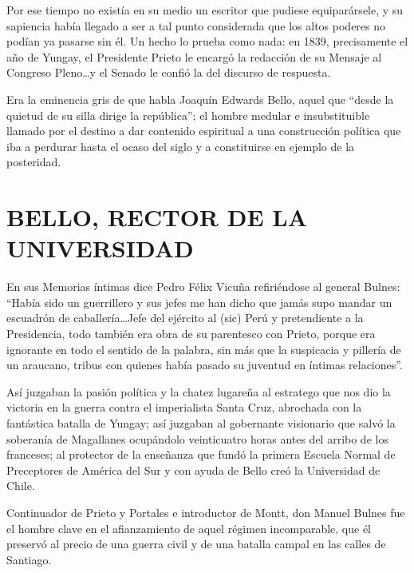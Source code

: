 \documentclass[10pt,twoside,openright]{memoir}
\begin{document}
Por ese tiempo no existía en su medio un escritor que pudiese
equiparársele, y su sapiencia había llegado a ser a tal punto
considerada que los altos poderes no podían ya pasarse sin él. Un hecho
lo prueba como nada: en 1839, precisamente el año de Yungay, el
Presidente Prieto le encargó la redacción de su Mensaje al Congreso
Pleno\ldots y el Senado le confió la del discurso de respuesta.

Era la eminencia gris de que habla Joaquín Edwards Bello, aquel que
``desde la quietud de su silla dirige la república''; el hombre medular e
insubstituible llamado por el destino a dar contenido espiritual a una
construcción política que iba a perdurar hasta el ocaso del siglo y a
constituirse en ejemplo de la posteridad.

\chapter{BELLO, RECTOR DE LA UNIVERSIDAD}

En sus Memorias íntimas dice Pedro Félix Vicuña refiriéndose al general
Bulnes: ``Había sido un guerrillero y sus jefes me han dicho que jamás
supo mandar un escuadrón de caballería\ldots Jefe del ejército al (sic)
Perú y pretendiente a la Presidencia, todo también era obra de su
parentesco con Prieto, porque era ignorante en todo el sentido de la
palabra, sin más que la suspicacia y pillería de un araucano, tribus con
quienes había pasado su juventud en íntimas relaciones''.

Así juzgaban la pasión política y la chatez lugareña al estratego que
nos dio la victoria en la guerra contra el imperialista Santa Cruz,
abrochada con la fantástica batalla de Yungay; así juzgaban al
gobernante visionario que salvó la soberanía de Magallanes ocupándolo
veinticuatro horas antes del arribo de los franceses; al protector de la
enseñanza que fundó la primera Escuela Normal de Preceptores de América
del Sur y con ayuda de Bello creó la Universidad de Chile.

Continuador de Prieto y Portales e introductor de Montt, don Manuel
Bulnes fue el hombre clave en el afianzamiento de aquel régimen
incomparable, que él preservó al precio de una guerra civil y de una
batalla campal en las calles de Santiago.
\end{document}
